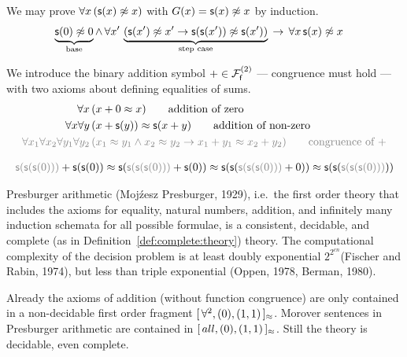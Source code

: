 \begin{example}
	We may prove \( \forall x\, (\msucc(x) \mNE x) \) with \( G(x) = \msucc(x) \mNE x \) by induction.
	\begin{align*}
		\underbrace{\msucc(0)\mNE 0}_{\text{base}}
		\land \, \forall x' \, &
		\underbrace{
			\left( \msucc(x')\mNE x' \limp \msucc(\msucc(x'))\mNE \msucc(x') \right)
		}_{\text{step case}}
		\, \limp \, \forall x \, \msucc(x)\mNE x
		\end{align*}
\end{example}

\begin{definition}
	[Addition]\label{def:addition:axioms}
	We introduce the binary addition symbol \( +\in\mcFfn[2] \)
	--- congruence must hold ---
	with two axioms about defining equalities of sums.
\begin{align*}
\forall x\,
&(x+0 \mEQ x)
\tag*{addition of zero}\\
\forall x\forall y\,
&(x+\msucc(y)) \mEQ \msucc(x+y)
\tag*{addition of non-zero}
\\
\colG\forall x_1\forall x_2\forall y_1\forall y_2\,
&\colG (x_1\mEQ y_1\land x_2\mEQ y_2 \limp x_1+y_1\mEQ x_2+y_2)
\tag*{congruence of \( + \)}
\end{align*}
\end{definition}

\begin{example}
	\begin{gather*}
	{\colG \msucc(\msucc(\msucc(0)))} + \msucc(\msucc(0))
	\mEQ\msucc({\colG \msucc(\msucc(\msucc(0)))} + \msucc(0))
	\mEQ \msucc(\msucc(
	{\colG \msucc(\msucc(\msucc(0)))} + 0))
	\mEQ \msucc(\msucc(
	{\colG \msucc(\msucc(\msucc(0)))}))
	\end{gather*}
\end{example}

\begin{theorem}Presburger arithmetic (Moj\'{z}esz Presburger, 1929), i.e.\ the first order theory that includes the axioms for equality, natural numbers, addition, and 
	infinitely many induction schemata for all possible formulae, is a consistent, decidable, and complete (as in Definition~\vref{def:complete:theory}) theory. 
	The computational complexity of the decision problem is at least doubly exponential \( 2^{2^{cn}} \)(Fischer and Rabin, 1974), but less than triple exponential (Oppen, 1978, Berman, 1980).
\end{theorem}

\begin{remark}
	Already the axioms of addition (without function congruence)
	are only contained in a non-decidable first order fragment
	\( [ \, \forall^2 , (0), (1,1) \, ]{}_{\mEQ} \). Morover
	sentences in Presburger arithmetic are contained in
	\( [ \, all , (0), (1,1) \, ]{}_{\mEQ} \).
	Still the theory is decidable, even complete.
\end{remark}

